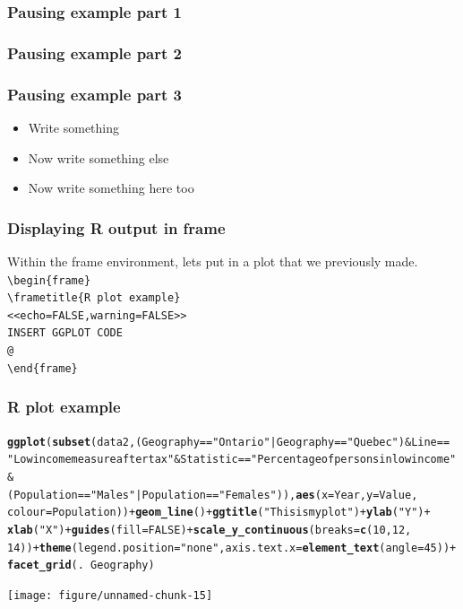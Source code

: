 \documentclass[nogin]{beamer}\usepackage[]{graphicx}\usepackage[]{color}
\makeatletter
\newcommand{\hlnum}[1]{\textcolor[rgb]{0.686,0.059,0.569}{#1}}%
\newcommand{\hlstr}[1]{\textcolor[rgb]{0.192,0.494,0.8}{#1}}%
\newcommand{\hlopt}[1]{\textcolor[rgb]{0,0,0}{#1}}%
\newcommand{\hlstd}[1]{\textcolor[rgb]{0.345,0.345,0.345}{#1}}%
\newcommand{\hlkwc}[1]{\textcolor[rgb]{0.333,0.667,0.333}{#1}}%
\newcommand{\hlkwd}[1]{\textcolor[rgb]{0.737,0.353,0.396}{\textbf{#1}}}%
\newenvironment{kframe}{%
 \def\at@end@of@kframe{}%
 \ifinner\ifhmode%
  \def\at@end@of@kframe{\end{minipage}}%
  \begin{minipage}{\columnwidth}%
 \fi\fi%
 \def\FrameCommand##1{\hskip\@totalleftmargin \hskip-\fboxsep
 \colorbox{shadecolor}{##1}\hskip-\fboxsep
     \hskip-\linewidth \hskip-\@totalleftmargin \hskip\columnwidth}%
 \MakeFramed {\advance\hsize-\width
   \@totalleftmargin\z@ \linewidth\hsize
   \@setminipage}}%
 {\par\unskip\endMakeFramed%
 \at@end@of@kframe}
\newenvironment{knitrout}{}{} %
\makeatother
\begin{document}
\begin{frame}
\frametitle<1>{Pausing example part 1}
\frametitle<2>{Pausing example part 2}
\frametitle<3>{Pausing example part 3}
\begin{itemize}
\item Write something
\pause
\item Now write something else
\pause
\item Now write something here too
\end{itemize}
\end{frame}

\begin{frame}[fragile]
\frametitle{Displaying R output in frame}
Within the frame environment, lets put in a plot that we previously made.\\
\verb|\begin{frame}|\\
\verb|\frametitle{R plot example}|\\
\verb|<<echo=FALSE,warning=FALSE>>|\\
\verb|INSERT GGPLOT CODE|\\
\verb|@|\\
\verb|\end{frame}|
\end{frame}

\begin{frame}[fragile]
\frametitle{R plot example}
\begin{knitrout}
\color{fgcolor}\begin{kframe}
\begin{alltt}
\hlkwd{ggplot}\hlstd{(}\hlkwd{subset}\hlstd{(data2, (Geography} \hlopt{==} \hlstr{"Ontario"} \hlopt{|} \hlstd{Geography} \hlopt{==} \hlstr{"Quebec"}\hlstd{)} \hlopt{&} \hlstd{Line} \hlopt{==}
    \hlstr{"Low income measure after tax"} \hlopt{&} \hlstd{Statistic} \hlopt{==} \hlstr{"Percentage of persons in low income"} \hlopt{&}
    \hlstd{(Population} \hlopt{==} \hlstr{"Males"} \hlopt{|} \hlstd{Population} \hlopt{==} \hlstr{"Females"}\hlstd{)),} \hlkwd{aes}\hlstd{(}\hlkwc{x} \hlstd{= Year,} \hlkwc{y} \hlstd{= Value,}
    \hlkwc{colour} \hlstd{= Population))} \hlopt{+} \hlkwd{geom_line}\hlstd{()} \hlopt{+} \hlkwd{ggtitle}\hlstd{(}\hlstr{"This is my plot"}\hlstd{)} \hlopt{+} \hlkwd{ylab}\hlstd{(}\hlstr{"Y"}\hlstd{)} \hlopt{+}
    \hlkwd{xlab}\hlstd{(}\hlstr{"X"}\hlstd{)} \hlopt{+} \hlkwd{guides}\hlstd{(}\hlkwc{fill} \hlstd{=} \hlnum{FALSE}\hlstd{)} \hlopt{+} \hlkwd{scale_y_continuous}\hlstd{(}\hlkwc{breaks} \hlstd{=} \hlkwd{c}\hlstd{(}\hlnum{10}\hlstd{,} \hlnum{12}\hlstd{,}
    \hlnum{14}\hlstd{))} \hlopt{+} \hlkwd{theme}\hlstd{(}\hlkwc{legend.position} \hlstd{=} \hlstr{"none"}\hlstd{,} \hlkwc{axis.text.x} \hlstd{=} \hlkwd{element_text}\hlstd{(}\hlkwc{angle} \hlstd{=} \hlnum{45}\hlstd{))} \hlopt{+}
    \hlkwd{facet_grid}\hlstd{(.} \hlopt{~} \hlstd{Geography)}
\end{alltt}
\end{kframe}
\texttt{[image: figure/unnamed-chunk-15]} 

\end{knitrout}

\end{frame}
\end{document}
